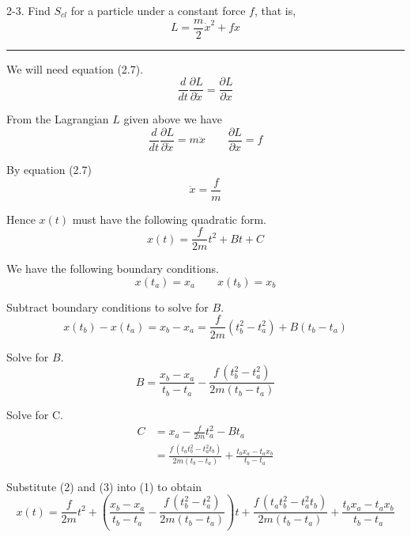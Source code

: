 \documentclass[12pt]{article}
\begin{document}
2-3.
Find $S_{cl}$ for a particle under a constant force $f$, that is,
\begin{equation*}
L=\frac{m}{2}\dot x^2+fx
\end{equation*}

\bigskip
\hrule

\bigskip
We will need equation (2.7).
\begin{equation*}
\frac{d}{dt}\frac{\partial L}{\partial\dot x}=\frac{\partial L}{\partial x}
\tag{2.7}
\end{equation*}

From the Lagrangian $L$ given above we have
\begin{equation*}
\frac{d}{dt}\frac{\partial L}{\partial\dot x}=m\ddot x
\qquad
\frac{\partial L}{\partial x}=f
\end{equation*}

By equation (2.7)
\begin{equation*}
\ddot x=\frac{f}{m}
\end{equation*}

Hence $x(t)$ must have the following quadratic form.
\begin{equation*}
x(t)=\frac{f}{2m}t^2+Bt+C
\tag{1}
\end{equation*}

We have the following boundary conditions.
\begin{equation*}
x(t_a)=x_a
\qquad
x(t_b)=x_b
\end{equation*}

Subtract boundary conditions to solve for $B$.
\begin{equation*}
x(t_b)-x(t_a)
=x_b-x_a
=\frac{f}{2m}\left(t_b^2-t_a^2\right)+B(t_b-t_a)
\end{equation*}

Solve for $B$.
\begin{equation*}
B=\frac{x_b-x_a}{t_b-t_a}-\frac{f\,\left(t_b^2-t_a^2\right)}{2m(t_b-t_a)}
\tag{2}
\end{equation*}

Solve for C.
\begin{align*}
C&=x_a-\frac{f}{2m}t_a^2-Bt_a
\\[1ex]
&=\frac{f\,\left(t_a t_b^2 - t_a^2 t_b\right)}{2 m (t_b - t_a)} + \frac{t_b x_a - t_a x_b}{t_b - t_a}
\tag{3}
\end{align*}

Substitute (2) and (3) into (1) to obtain
\begin{equation*}
x(t)=
\frac{f}{2m}t^2
+\left(\frac{x_b-x_a}{t_b-t_a}-\frac{f\,\left(t_b^2-t_a^2\right)}{2m(t_b-t_a)}\right)t
+\frac{f\,\left(t_a t_b^2 - t_a^2 t_b\right)}{2 m (t_b - t_a)} + \frac{t_b x_a - t_a x_b}{t_b - t_a}
\tag{4}
\end{equation*}
\end{document}
